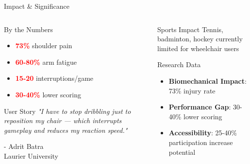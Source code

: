 \documentclass[aspectratio=169]{beamer}
\begin{document}
\begin{frame}{Impact \& Significance}
\begin{columns}[T]
\begin{column}{0.48\textwidth}
\begin{block}{By the Numbers}
\begin{itemize}
    \item \textcolor{red}{\textbf{73\%}} shoulder pain
    \item \textcolor{red}{\textbf{60-80\%}} arm fatigue
    \item \textcolor{red}{\textbf{15-20}} interruptions/game
    \item \textcolor{red}{\textbf{30-40\%}} lower scoring
\end{itemize}
\end{block}

\vspace{0.4cm}
\begin{block}{User Story}
\textit{"I have to stop dribbling just to reposition my chair — which interrupts gameplay and reduces my reaction speed."}

\vspace{0.3cm}
- Adrit Batra\\
Laurier University
\end{block}
\end{column}

\begin{column}{0.48\textwidth}
\begin{block}{Sports Impact}
Tennis, badminton, hockey currently limited for wheelchair users
\end{block}

\vspace{0.4cm}
\begin{block}{Research Data}
\begin{itemize}
    \item \textbf{Biomechanical Impact}: 73\% injury rate
    \item \textbf{Performance Gap}: 30-40\% lower scoring
    \item \textbf{Accessibility}: 25-40\% participation increase potential
\end{itemize}
\end{block}
\end{column}
\end{columns}
\end{frame}
\end{document}
